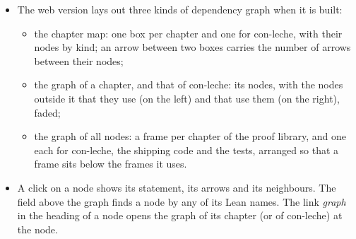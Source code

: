 

\begin{itemize}
\item {} The web version lays out three kinds of dependency graph when it is built:
  \begin{itemize}
  \item the chapter map: one box per chapter and one for con-leche, with their nodes by kind; an
    arrow between two boxes carries the number of arrows between their nodes;
  \item the graph of a chapter, and that of con-leche: its nodes, with the nodes outside it that
    they use (on the left) and that use them (on the right), faded;
  \item the graph of all nodes: a frame per chapter of the proof library, and one each for
    con-leche, the shipping code and the tests, arranged so that a frame sits below the frames it
    uses.
  \end{itemize}
\item {} A click on a node shows its statement, its arrows and its neighbours. The
  field above the graph finds a node by any of its Lean names. The link \emph{graph} in the
  heading of a node opens the graph of its chapter (or of con-leche) at the node.
\end{itemize}


